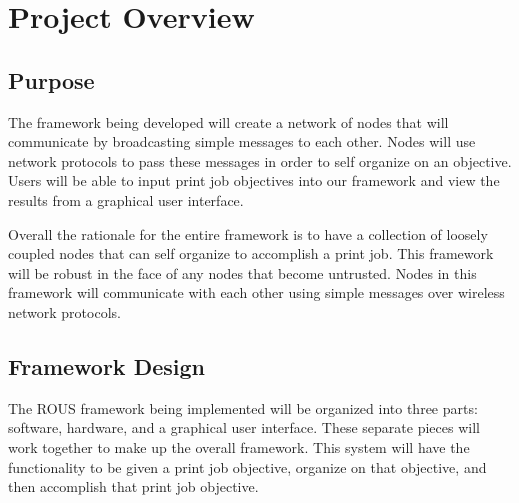 \documentclass[draftclsnofoot, onecolumn, compsoc, 10pt]{IEEEtran}
\begin{document}
% 
%
%



\section{Project Overview}
\subsection{Purpose}
The framework being developed will create a network of nodes that will communicate by broadcasting simple messages to each other. Nodes will use network protocols to pass these messages in order to self organize on an objective. Users will be able to input print job objectives into our framework and view the results from a graphical user interface.

Overall the rationale for the entire framework is to have a collection of loosely coupled nodes that can self organize to accomplish a print job. This framework will be robust in the face of any nodes that become untrusted. Nodes in this framework will communicate with each other using simple messages over wireless network protocols.

\subsection{Framework Design}
The ROUS framework being implemented will be organized into three parts: software, hardware, and a graphical user interface. These separate pieces will work together to make up the overall framework. This system will have the functionality to be given a print job objective, organize on that objective, and then accomplish that print job objective.
\end{document}

